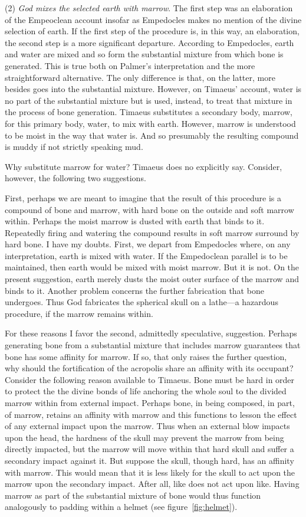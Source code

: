(2) \emph{God mixes the selected earth with marrow}. The first step was an elaboration of the Empeoclean account insofar as Empedocles makes no mention of the divine selection of earth. If the first step of the procedure is, in this way, an elaboration, the second step is a more significant departure. According to Empedocles, earth and water are mixed and so form the substantial mixture from which bone is generated. This is true both on Palmer's \citeyearpar{Palmer:2009qf} interpretation and the more straightforward alternative. The only difference is that, on the latter, more besides goes into the substantial mixture. However, on Timaeus' account, water is no part of the substantial mixture but is used, instead, to treat that mixture in the process of bone generation. Timaeus substitutes a secondary body, marrow, for this primary body, water, to mix with earth. However, marrow is understood to be moist in the way that water is. And so presumably the resulting compound is muddy if not strictly speaking mud.

Why substitute marrow for water? Timaeus does no explicitly say. Consider, however, the following two suggestions.

First, perhaps we are meant to imagine that the result of this procedure is a compound of bone and marrow, with hard bone on the outside and soft marrow within. Perhaps the moist marrow is dusted with earth that binds to it. Repeatedly firing and watering the compound results in soft marrow surround by hard bone. I have my doubts. First, we depart from Empedocles where, on any interpretation, earth is mixed with water. If the Empedoclean parallel is to be maintained, then earth would be mixed with moist marrow. But it is not. On the present suggestion, earth merely dusts the moist outer surface of the marrow and binds to it. Another problem concerns the further fabrication that bone undergoes. Thus God fabricates the spherical skull on a lathe---a hazardous procedure, if the marrow remains within.

For these reasons I favor the second, admittedly speculative, suggestion. Perhaps generating bone from a substantial mixture that includes marrow guarantees that bone has some affinity for marrow. If so, that only raises the further question, why should the fortification of the acropolis share an affinity with its occupant? Consider the following reason available to Timaeus. Bone must be hard in order to protect the the divine bonds of life anchoring the whole soul to the divided marrow within from external impact. Perhaps bone, in being composed, in part, of marrow, retains an affinity with marrow and this functions to lesson the effect of any external impact upon the marrow. Thus when an external blow impacts upon the head, the hardness of the skull may prevent the marrow from being directly impacted, but the marrow will move within that hard skull and suffer a secondary impact against it. But suppose the skull, though hard, has an affinity with marrow. This would mean that it is less likely for the skull to act upon the marrow upon the secondary impact. After all, like does not act upon like. Having marrow as part of the substantial mixture of bone would thus function analogously to padding within a helmet (see figure~\ref{fig:helmet}).

